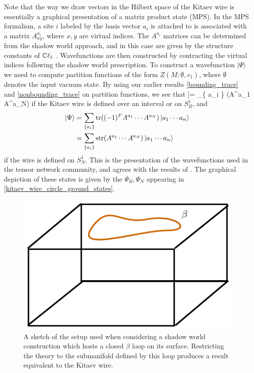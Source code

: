 Note that the way we draw vectors in the Hilbert space of the Kitaev wire is essentially a graphical presentation of a matrix product state (MPS). 
In the MPS formalism, a site $i$ labeled by the basis vector $a_i$ is attached 
to is associated with a matrix $A^{a_i}_{xy}$, where $x,y$ are virtual indices. 
The $A^{a_i}$ matrices can be determined from the shadow world approach, and in this case are given by the structure constants of $\mathbb{C}\ell_1$ \cite{turzillo2016}. 
Wavefunctions are then constructed by contracting the virtual indices following the 
shadow world prescription. To construct a wavefunction $|\Psi\rangle$ we need to compute 
partition functions of the form $Z(M;\emptyset,v_1)$, where $\emptyset$ denotes 
the input vacuum state. 
By using our earlier results \eqref{bounding_trace} and \eqref{nonbounding_trace} on 
partition functions, we see that 
\be |\Psi\rangle = \sum_{\{ a_i \} }\tr(A^{a_1} \cdots A^{a_N})  \ee
if the Kitaev wire is defined over an interval or on $S^1_B$, and 
\begin{align}
 |\Psi\rangle & = \sum_{\{ a_i \} }\text{tr}((-1)^FA^{a_1} \cdots A^{a_N}) \left|a_1 \cdots a_n\right\rangle \\ 
 & =\sum_{\{ a_i \} }\text{str}(A^{a_1} \cdots A^{a_N}) \left|a_1 \cdots a_n\right\rangle 
 \end{align}
if the wire is defined on $S^1_N$. 
This is the presentation of the wavefunctions used in the tensor network community, 
and agrees with the results of \cite{turzillo2016,bultinck2017b}. 
The graphical depiction of these states is given by the $\Psi_B,\Psi_N$ appearing in \eqref{kitaev_wire_circle_ground_states}. 

\begin{figure}
\centering
\includegraphics{box_beta_loop.pdf}
\caption{ \label{box_beta_loop} A sketch of the setup used when considering a shadow world construction which hosts a closed $\beta$ loop on its surface. Restricting the theory to the submanifold defined by this loop produces a result equivalent to the Kitaev wire. }
\end{figure}

